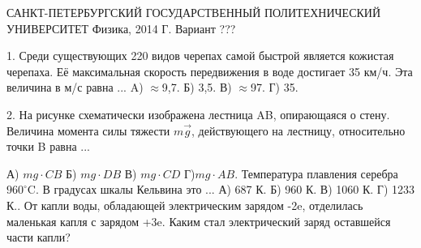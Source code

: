 \documentclass[12pt,a4paper,oneside]{article}
\begin{document}
\begin{center}
САНКТ-ПЕТЕРБУРГСКИЙ ГОСУДАРСТВЕННЫЙ\newline
ПОЛИТЕХНИЧЕСКИЙ УНИВЕРСИТЕТ\newline
Физика, 2014 Г.\newline
Вариант ???\newline
\end{center} 
1. Среди существующих 220 видов черепах самой быстрой является кожистая черепаха. Её максимальная скорость передвижения в воде достигает 35 км/ч. Эта величина в м/с равна ...\newline
A) \(\approx\)9,7. Б) 3,5. В) \(\approx\)97. Г) 35. \newline
\begin{minipage}{0.72\textwidth}
2. На рисунке схематически изображена лестница AB, опирающаяся о стену. Величина момента силы тяжести \(m\vec{g}\), действующего на лестницу, относительно точки B равна ...\newline
\end{minipage}
\begin{minipage}{0.24\textwidth}
\begin{flushright}
\end{flushright}
\end{minipage}\newline
А) \(mg \cdot CB\) Б) \(mg \cdot DB\) В) \(mg \cdot CD\) Г)\(mg \cdot AB\). Температура плавления серебра \(960^{\circ}\)C. В градусах шкалы Кельвина это ...\newline
А) 687 К. Б) 960 К. В) 1060 К. Г) 1233 К.. От капли воды, обладающей электрическим зарядом -2e, отделилась маленькая капля с зарядом +3e. Каким стал электрический заряд оставшейся части капли?\newline
\end{document}
